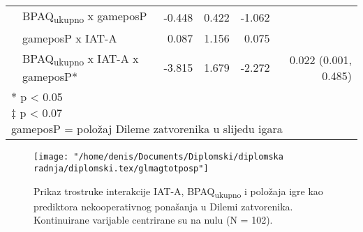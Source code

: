 \documentclass[a4paper, 12pt]{report}
\begin{document}
\begin{appendices}
\begin{table}[h]
\begin{center}
\begin{tabular}{llrrrr}
        &BPAQ\textsubscript{ukupno} x gameposP & -0.448 & 0.422 & -1.062 &\\
        &gameposP x IAT-A & 0.087 & 1.156 & 0.075 &\\
        & BPAQ\textsubscript{ukupno} x IAT-A x gameposP* & -3.815 &
        1.679 & -2.272 & 0.022 (0.001, 0.485)\\
        \bottomrule
        \multicolumn{6}{l}{
            \parbox{9cm}{\scriptsize \vspace{3pt} 
                * p < 0.05\\
                $\ddagger$ p < 0.07\\
                gameposP = položaj Dileme zatvorenika u slijedu igara
        }}
    \end{tabular}
\end{center}
\end{table}
\vspace*{\fill}
\clearpage

\begin{figure}
    \begin{center}
        \caption{\label{glmtotposPplot} Prikaz trostruke interakcije IAT-A,
            BPAQ\textsubscript{ukupno} i položaja igre kao prediktora
            nekooperativnog ponašanja u Dilemi zatvorenika. Kontinuirane
            varijable centrirane su na nulu (N = 102).}
        \texttt{[image: "/home/denis/Documents/Diplomski/diplomska radnja/diplomski.tex/glmagtotposp"]}
    \end{center}
\end{figure}


\end{appendices}
\end{document}
